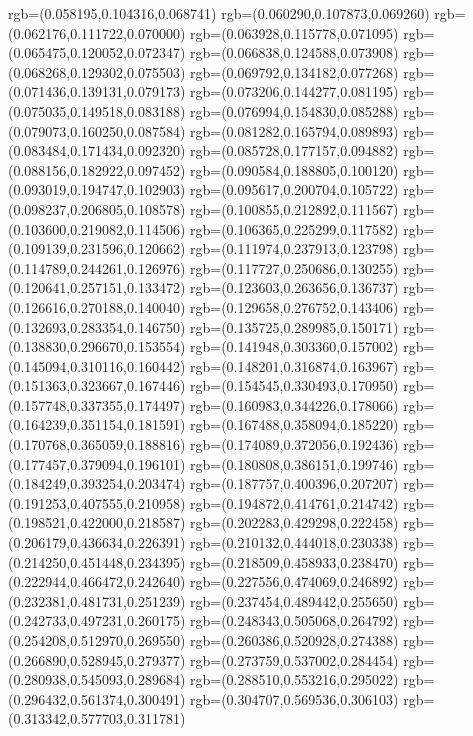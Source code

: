 {{{			rgb=(0.058195,0.104316,0.068741)
			rgb=(0.060290,0.107873,0.069260)
			rgb=(0.062176,0.111722,0.070000)
			rgb=(0.063928,0.115778,0.071095)
			rgb=(0.065475,0.120052,0.072347)
			rgb=(0.066838,0.124588,0.073908)
			rgb=(0.068268,0.129302,0.075503)
			rgb=(0.069792,0.134182,0.077268)
			rgb=(0.071436,0.139131,0.079173)
			rgb=(0.073206,0.144277,0.081195)
			rgb=(0.075035,0.149518,0.083188)
			rgb=(0.076994,0.154830,0.085288)
			rgb=(0.079073,0.160250,0.087584)
			rgb=(0.081282,0.165794,0.089893)
			rgb=(0.083484,0.171434,0.092320)
			rgb=(0.085728,0.177157,0.094882)
			rgb=(0.088156,0.182922,0.097452)
			rgb=(0.090584,0.188805,0.100120)
			rgb=(0.093019,0.194747,0.102903)
			rgb=(0.095617,0.200704,0.105722)
			rgb=(0.098237,0.206805,0.108578)
			rgb=(0.100855,0.212892,0.111567)
			rgb=(0.103600,0.219082,0.114506)
			rgb=(0.106365,0.225299,0.117582)
			rgb=(0.109139,0.231596,0.120662)
			rgb=(0.111974,0.237913,0.123798)
			rgb=(0.114789,0.244261,0.126976)
			rgb=(0.117727,0.250686,0.130255)
			rgb=(0.120641,0.257151,0.133472)
			rgb=(0.123603,0.263656,0.136737)
			rgb=(0.126616,0.270188,0.140040)
			rgb=(0.129658,0.276752,0.143406)
			rgb=(0.132693,0.283354,0.146750)
			rgb=(0.135725,0.289985,0.150171)
			rgb=(0.138830,0.296670,0.153554)
			rgb=(0.141948,0.303360,0.157002)
			rgb=(0.145094,0.310116,0.160442)
			rgb=(0.148201,0.316874,0.163967)
			rgb=(0.151363,0.323667,0.167446)
			rgb=(0.154545,0.330493,0.170950)
			rgb=(0.157748,0.337355,0.174497)
			rgb=(0.160983,0.344226,0.178066)
			rgb=(0.164239,0.351154,0.181591)
			rgb=(0.167488,0.358094,0.185220)
			rgb=(0.170768,0.365059,0.188816)
			rgb=(0.174089,0.372056,0.192436)
			rgb=(0.177457,0.379094,0.196101)
			rgb=(0.180808,0.386151,0.199746)
			rgb=(0.184249,0.393254,0.203474)
			rgb=(0.187757,0.400396,0.207207)
			rgb=(0.191253,0.407555,0.210958)
			rgb=(0.194872,0.414761,0.214742)
			rgb=(0.198521,0.422000,0.218587)
			rgb=(0.202283,0.429298,0.222458)
			rgb=(0.206179,0.436634,0.226391)
			rgb=(0.210132,0.444018,0.230338)
			rgb=(0.214250,0.451448,0.234395)
			rgb=(0.218509,0.458933,0.238470)
			rgb=(0.222944,0.466472,0.242640)
			rgb=(0.227556,0.474069,0.246892)
			rgb=(0.232381,0.481731,0.251239)
			rgb=(0.237454,0.489442,0.255650)
			rgb=(0.242733,0.497231,0.260175)
			rgb=(0.248343,0.505068,0.264792)
			rgb=(0.254208,0.512970,0.269550)
			rgb=(0.260386,0.520928,0.274388)
			rgb=(0.266890,0.528945,0.279377)
			rgb=(0.273759,0.537002,0.284454)
			rgb=(0.280938,0.545093,0.289684)
			rgb=(0.288510,0.553216,0.295022)
			rgb=(0.296432,0.561374,0.300491)
			rgb=(0.304707,0.569536,0.306103)
			rgb=(0.313342,0.577703,0.311781)
}}}
